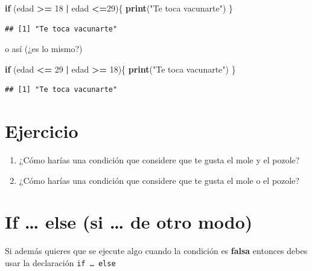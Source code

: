 \documentclass[
]{book}
\newenvironment{Shaded}{\begin{snugshade}}{\end{snugshade}}
\newcommand{\ControlFlowTok}[1]{\textcolor[rgb]{0.13,0.29,0.53}{\textbf{#1}}}
\newcommand{\DecValTok}[1]{\textcolor[rgb]{0.00,0.00,0.81}{#1}}
\newcommand{\FunctionTok}[1]{\textcolor[rgb]{0.13,0.29,0.53}{\textbf{#1}}}
\newcommand{\NormalTok}[1]{#1}
\newcommand{\SpecialCharTok}[1]{\textcolor[rgb]{0.81,0.36,0.00}{\textbf{#1}}}
\newcommand{\StringTok}[1]{\textcolor[rgb]{0.31,0.60,0.02}{#1}}
\begin{document}
\begin{Shaded}
\begin{Highlighting}[]
\ControlFlowTok{if}\NormalTok{ (edad }\SpecialCharTok{\textgreater{}=} \DecValTok{18} \SpecialCharTok{|}\NormalTok{ edad }\SpecialCharTok{\textless{}=}\DecValTok{29}\NormalTok{)\{}
  \FunctionTok{print}\NormalTok{(}\StringTok{"Te toca vacunarte"}\NormalTok{)}
\NormalTok{\}}
\end{Highlighting}
\end{Shaded}

\begin{verbatim}
## [1] "Te toca vacunarte"
\end{verbatim}

o así (¿es lo mismo?)

\begin{Shaded}
\begin{Highlighting}[]
\ControlFlowTok{if}\NormalTok{ (edad }\SpecialCharTok{\textless{}=} \DecValTok{29} \SpecialCharTok{|}\NormalTok{ edad }\SpecialCharTok{\textgreater{}=} \DecValTok{18}\NormalTok{)\{}
  \FunctionTok{print}\NormalTok{(}\StringTok{"Te toca vacunarte"}\NormalTok{)}
\NormalTok{\}}
\end{Highlighting}
\end{Shaded}

\begin{verbatim}
## [1] "Te toca vacunarte"
\end{verbatim}

\hypertarget{ejercicio}{%
\section{Ejercicio}\label{ejercicio}}

\begin{enumerate}
\def\labelenumi{\arabic{enumi}.}
\item
  ¿Cómo harías una condición que considere que te gusta el mole y el pozole?
\item
  ¿Cómo harías una condición que considere que te gusta el mole o el pozole?
\end{enumerate}

\hypertarget{if-else-si-de-otro-modo}{%
\section{If \ldots{} else (si \ldots{} de otro modo)}\label{if-else-si-de-otro-modo}}

Si además quieres que se ejecute algo cuando la condición es \textbf{falsa} entonces debes usar la declaración \texttt{if\ …\ else}
\end{document}
